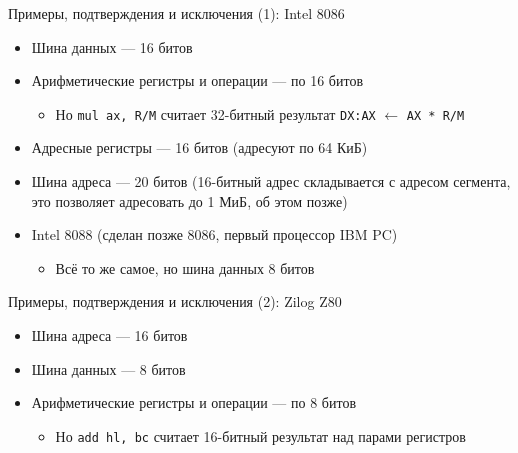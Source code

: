 \documentclass[xetex,aspectratio=43]{beamer}
\begin{document}
\begin{frame}{Примеры, подтверждения и исключения (1): Intel 8086}
\begin{itemize}
    \item
    Шина данных --- 16 битов
    \item
    Арифметические регистры и операции --- по 16 битов

    \begin{itemize}
        \item
        Но \texttt{mul ax, R/M} считает 32-битный результат
        \texttt{DX:AX} $\gets$ \texttt{AX * R/M}
    \end{itemize}
    \item
    Адресные регистры --- 16 битов (адресуют по 64 КиБ)
    \item
    Шина адреса --- 20 битов (16-битный адрес складывается с адресом
    сегмента, это позволяет адресовать до 1 МиБ, об этом позже)

    \pause
    \item
    Intel 8088 (сделан позже 8086, первый процессор IBM PC)

    \begin{itemize}
        \tightlist
        \item
        Всё то же самое, но шина данных 8 битов
    \end{itemize}
\end{itemize}

\end{frame}

\begin{frame}{Примеры, подтверждения и исключения (2): Zilog Z80}
\begin{itemize}
    \item
    Шина адреса --- 16 битов
    \item
    Шина данных --- 8 битов
    \item
    Арифметические регистры и операции --- по 8 битов

    \begin{itemize}
        \item
        Но \texttt{add hl, bc} считает 16-битный результат над парами
        регистров
    \end{itemize}
\end{itemize}
\end{frame}
\end{document}
